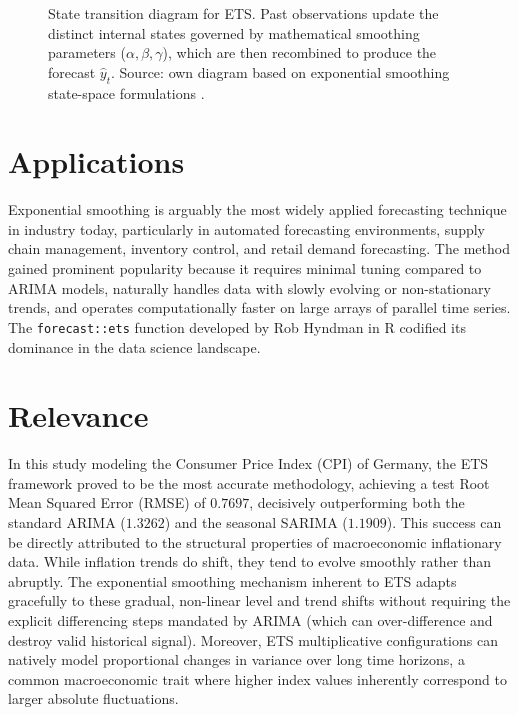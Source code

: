 \begin{figure}[htbp]
\centering

\caption{State transition diagram for ETS. Past observations update the distinct internal states governed by mathematical smoothing parameters ($\alpha, \beta, \gamma$), which are then recombined to produce the forecast $\hat{y}_t$. Source: own diagram based on exponential smoothing state-space formulations \cite{Hyndman2021}.}
\label{fig:ets_tikz}
\end{figure}

\section{Applications}
Exponential smoothing is arguably the most widely applied forecasting technique in industry today, particularly in automated forecasting environments, supply chain management, inventory control, and retail demand forecasting. The method gained prominent popularity because it requires minimal tuning compared to ARIMA models, naturally handles data with slowly evolving or non-stationary trends, and operates computationally faster on large arrays of parallel time series. The \texttt{forecast::ets} function developed by Rob Hyndman in R codified its dominance in the data science landscape.

\section{Relevance}
In this study modeling the Consumer Price Index (CPI) of Germany, the ETS framework proved to be the most accurate methodology, achieving a test Root Mean Squared Error (RMSE) of $0.7697$, decisively outperforming both the standard ARIMA ($1.3262$) and the seasonal SARIMA ($1.1909$). This success can be directly attributed to the structural properties of macroeconomic inflationary data. While inflation trends do shift, they tend to evolve smoothly rather than abruptly. The exponential smoothing mechanism inherent to ETS adapts gracefully to these gradual, non-linear level and trend shifts without requiring the explicit differencing steps mandated by ARIMA (which can over-difference and destroy valid historical signal). Moreover, ETS multiplicative configurations can natively model proportional changes in variance over long time horizons, a common macroeconomic trait where higher index values inherently correspond to larger absolute fluctuations.

